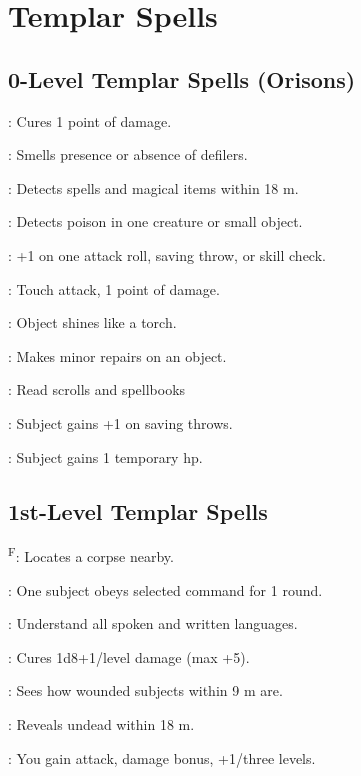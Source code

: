 \section{Templar Spells}



\subsection{0-Level Templar Spells (Orisons)}

: Cures 1 point of damage.

: Smells presence or absence of defilers.

: Detects spells and magical items within 18 m.

: Detects poison in one creature or small object.

: +1 on one attack roll, saving throw, or skill check.

: Touch attack, 1 point of damage.

: Object shines like a torch.

: Makes minor repairs on an object.

: Read scrolls and spellbooks

: Subject gains +1 on saving throws.

: Subject gains 1 temporary hp.



\subsection{1st-Level Templar Spells}

\textsuperscript{F}: Locates a corpse nearby.

: One subject obeys selected command for 1 round.

: Understand all spoken and written languages.

: Cures 1d8+1/level damage (max +5).

: Sees how wounded subjects within 9 m are.

: Reveals undead within 18 m.

: You gain attack, damage bonus, +1/three levels.

